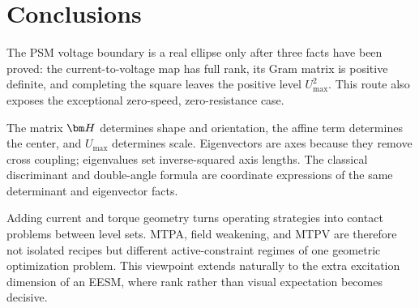 \section{Conclusions}

The PSM voltage boundary is a real ellipse only after three facts have been
proved: the current-to-voltage map has full rank, its Gram matrix is positive
definite, and completing the square leaves the positive level
$U_{\max}^2$.  This route also exposes the exceptional zero-speed,
zero-resistance case.

The matrix $\Hpsm$ determines shape and orientation, the affine term determines
the center, and $U_{\max}$ determines scale.  Eigenvectors are axes because
they remove cross coupling; eigenvalues set inverse-squared axis lengths.
The classical discriminant and double-angle formula are coordinate expressions
of the same determinant and eigenvector facts.

Adding current and torque geometry turns operating strategies into contact
problems between level sets.  MTPA, field weakening, and MTPV are therefore not
isolated recipes but different active-constraint regimes of one geometric
optimization problem.  This viewpoint extends naturally to the extra
excitation dimension of an EESM, where rank rather than visual expectation
becomes decisive.
